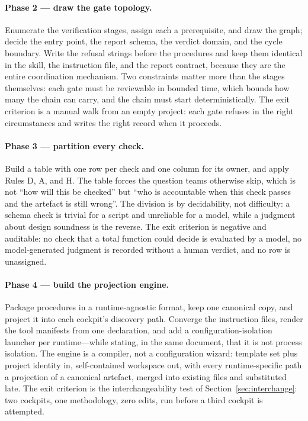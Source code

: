 \documentclass[10pt,a4paper]{article}
\theoremstyle{definition}
\theoremstyle{plain}
\theoremstyle{principle}
\begin{document}
\paragraph{Phase 2 --- draw the gate topology.} Enumerate the verification stages, assign each a
prerequisite, and draw the graph; decide the entry point, the report schema, the verdict domain,
and the cycle boundary. Write the refusal strings before the procedures and keep them identical in
the skill, the instruction file, and the report contract, because they are the entire coordination
mechanism. Two constraints matter more than the stages themselves: each gate must be reviewable in
bounded time, which bounds how many the chain can carry, and the chain must start deterministically.
The exit criterion is a manual walk from an empty project: each gate refuses in the right
circumstances and writes the right record when it proceeds.

\paragraph{Phase 3 --- partition every check.} Build a table with one row per check and one column
for its owner, and apply Rules D, A, and H. The table forces the question teams otherwise skip,
which is not ``how will this be checked'' but ``who is accountable when this check passes and the
artefact is still wrong''. The division is by decidability, not difficulty: a schema check is
trivial for a script and unreliable for a model, while a judgment about design soundness is the
reverse. The exit criterion is negative and auditable: no check that a total function could decide
is evaluated by a model, no model-generated judgment is recorded without a human verdict, and no
row is unassigned.

\paragraph{Phase 4 --- build the projection engine.} Package procedures in a runtime-agnostic
format, keep one canonical copy, and project it into each cockpit's discovery path. Converge the
instruction files, render the tool manifests from one declaration, and add a configuration-isolation
launcher per runtime---while stating, in the same document, that it is not process isolation. The engine is a compiler, not a configuration wizard: template set plus project
identity in, self-contained workspace out, with every runtime-specific path a projection of a
canonical artefact, merged into existing files and substituted late. The exit criterion is the
interchangeability test of Section~\ref{sec:interchange}: two cockpits, one methodology, zero edits,
run before a third cockpit is attempted.
\end{document}

